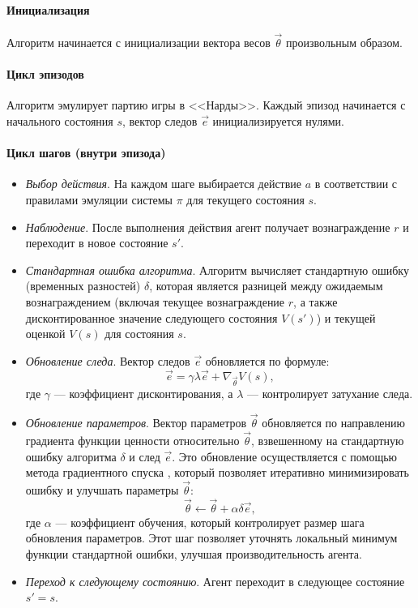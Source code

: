 
\paragraph{Инициализация}
Алгоритм начинается с инициализации вектора весов $\vec{\theta}$ произвольным образом.

\paragraph{Цикл эпизодов}
Алгоритм эмулирует партию игры в <<Нарды>>. Каждый эпизод начинается с начального состояния $s$, вектор следов $\vec{e}$ инициализируется нулями.

\paragraph{Цикл шагов (внутри эпизода)}
\begin{itemize}
    \item \textit{Выбор действия}. На каждом шаге выбирается действие $a$ в соответствии с правилами эмуляции системы $\pi$ для текущего состояния $s$.
    \item \textit{Наблюдение}. После выполнения действия агент получает вознаграждение $r$ и переходит в новое состояние $s'$.
    \item \textit{Стандартная ошибка алгоритма}. Алгоритм вычисляет стандартную ошибку (временных разностей) $\delta$, которая является разницей между ожидаемым вознаграждением (включая текущее вознаграждение $r$, а также дисконтированное значение следующего состояния $V(s')$) и текущей оценкой $V(s)$ для состояния $s$.
    \item \textit{Обновление следа}. Вектор следов $\vec{e}$ обновляется по формуле:
    \begin{equation}
        \vec{e} = \gamma \lambda \vec{e} + \nabla_{\vec{\theta}} V(s),
    \end{equation}
    где $\gamma$ --- коэффициент дисконтирования, а $\lambda$ --- контролирует затухание следа.
    \item \textit{Обновление параметров}. Вектор параметров $\vec{\theta}$ обновляется по направлению градиента функции ценности относительно $\vec{\theta}$, взвешенному на стандартную ошибку алгоритма $\delta$ и след $\vec{e}$. Это обновление осуществляется с помощью метода градиентного спуска \cite{gradient-descent}, который позволяет итеративно минимизировать ошибку и улучшать параметры $\vec{\theta}$:
    \begin{equation}
        \vec{\theta} \gets \vec{\theta} + \alpha \delta \vec{e},
    \end{equation}
    где $\alpha$ --- коэффициент обучения, который контролирует размер шага обновления параметров. Этот шаг позволяет уточнять локальный минимум функции стандартной ошибки, улучшая производительность агента.
    \item \textit{Переход к следующему состоянию}. Агент переходит в следующее состояние $s' = s$.
    \end{itemize}

